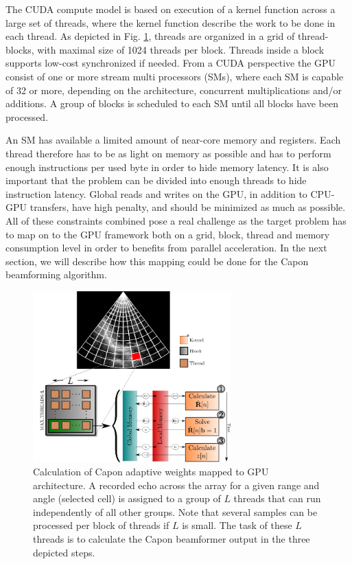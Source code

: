\documentclass[12pt,journal,onecolumn]{IEEEtran}
\begin{document}
The CUDA compute model is based on execution of a kernel function across a large set of threads, where the kernel function describe the work to be done in each thread. As depicted in Fig. \ref{fig:gpulayout}, threads are organized in a grid of thread-blocks, with maximal size of 1024 threads per block. Threads inside a block supports low-cost synchronized if needed. From a CUDA perspective the GPU consist of one or more stream multi processors (SMs), where each SM is capable of 32 or more, depending on the architecture, concurrent multiplications and/or additions. A group of blocks is scheduled to each SM until all blocks have been processed. 

An SM has available a limited amount of near-core memory and registers. Each thread therefore has to be as light on memory as possible and has to perform enough instructions per used byte in order to hide memory latency. It is also important that the problem can be divided into enough threads to hide instruction latency. Global reads and writes on the GPU, in addition to CPU-GPU transfers, have high penalty, and should be minimized as much as possible. All of these constraints combined pose a real challenge as the target problem has to map on to the GPU framework both on a grid, block, thread and memory consumption level in order to benefits from parallel acceleration. In the next section, we will describe how this mapping could be done for the Capon beamforming algorithm.    

\begin{figure}
\centerline{\includegraphics[width=3in]{gfx/gpu_layout_vertical_lr.png}}
\caption{Calculation of Capon adaptive weights mapped to GPU architecture. A recorded echo across the array for a given range and angle (selected cell) is assigned to a group of $L$ threads that can run independently of all other groups. Note that several samples can be processed per block of threads if $L$ is small. The task of these $L$ threads is to calculate the Capon beamformer output in the three depicted steps.}
\label{fig:gpulayout}
\end{figure}
\end{document}
